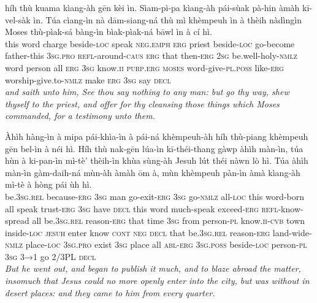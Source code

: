 \documentclass[11pt,a4paper]{article}
\begin{document}
\begin{exe}
\gll híh thù kuama kìang-àh gēn kèi ìn. Sìam-pì-pa kìang-àh pái-sùak pà-hin àmàh kī-vel-sàk ìn. Túa cìang-ìn nà dām-siang-ná thù mì khèmpeuh ìn à thèih nàdìngìn Moses thù-pìak-sá bàng-ìn bìak-pìak-ná bāwl ìn à cí hì. \\
     this word charge beside-\textsc{loc} speak \textsc{neg}.\textsc{emph} \textsc{erg} priest beside-\textsc{loc} go-become father-this \textsc{3sg}.\textsc{pro} \textsc{refl}-around-\textsc{caus} \textsc{erg} that then-\textsc{erg} \textsc{2sg} be.well-holy-\textsc{nmlz} word person all \textsc{erg} \textsc{3sg} know.\textsc{ii} \textsc{purp}.\textsc{erg} \textsc{moses} word-give-\textsc{pl}.\textsc{poss} like-\textsc{erg} worship-give.to-\textsc{nmlz} make \textsc{erg} \textsc{3sg} say \textsc{decl} \\
\glt \textcolor{kjvcolor}{\textit{and saith unto him, See thou say nothing to any man: but go thy way, shew thyself to the priest, and offer for thy cleansing those things which Moses commanded, for a testimony unto them.}}

\gll Àhìh hàng-ìn à mipa pái-khìa-ìn à pái-ná khèmpeuh-àh híh thù-piang khèmpeuh gēn bel-ìn à néi hì. Híh thù nak-gēn lúa-ìn kī-théi-thang gàwp àhìh màn-ìn, túa hùn à ki-pan-ìn mì-tè' thèih-ìn khùa sùng-àh Jesuh lút théi nàwn lò hì. Túa àhìh màn-ìn gàm-daih-ná mùn-àh àmàh ōm à, mùn khèmpeuh pàn-ìn àmà kìang-àh mì-tè à hòng pái ùh hì. \\
     be.\textsc{3sg}.\textsc{rel} because-\textsc{erg} \textsc{3sg} man go-exit-\textsc{erg} \textsc{3sg} go-\textsc{nmlz} all-\textsc{loc} this word-born all speak trust-\textsc{erg} \textsc{3sg} have \textsc{decl} this word much-speak exceed-\textsc{erg} \textsc{refl}-know-spread all be.\textsc{3sg}.\textsc{rel} reason-\textsc{erg} that time \textsc{3sg} from person-\textsc{pl} know.\textsc{ii}-\textsc{cvb} town inside-\textsc{loc} \textsc{jesuh} enter know \textsc{cont} \textsc{neg} \textsc{decl} that be.\textsc{3sg}.\textsc{rel} reason-\textsc{erg} land-wide-\textsc{nmlz} place-\textsc{loc} \textsc{3sg}.\textsc{pro} exist \textsc{3sg} place all \textsc{abl}-\textsc{erg} \textsc{3sg}.\textsc{poss} beside-\textsc{loc} person-\textsc{pl} \textsc{3sg} \textsc{3→1} go 2/3PL \textsc{decl} \\
\glt \textcolor{kjvcolor}{\textit{But he went out, and began to publish it much, and to blaze abroad the matter, insomuch that Jesus could no more openly enter into the city, but was without in desert places: and they came to him from every quarter.}}

\end{exe}
\newpage
\end{document}
